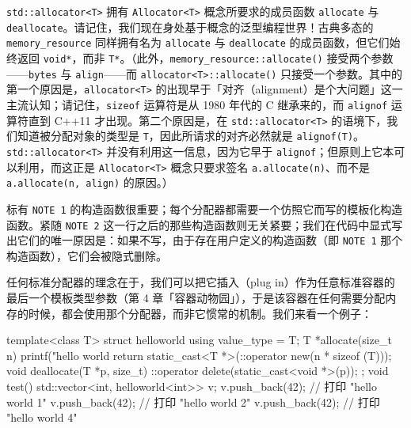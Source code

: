 \texttt{std::\allowbreak{}allocator<\allowbreak{}T>\allowbreak{}} 拥有 \texttt{Allocator<\allowbreak{}T>\allowbreak{}} 概念所要求的成员函数 \texttt{allocate} 与 \texttt{deallocate}。请记住，我们现在身处基于概念的泛型编程世界！古典多态的 \texttt{memory\_\allowbreak{}resource} 同样拥有名为 \texttt{allocate} 与 \texttt{deallocate} 的成员函数，但它们始终返回 \texttt{void*}，而非 \texttt{T*}。（此外，\texttt{memory\_\allowbreak{}resource::\allowbreak{}allocate(\allowbreak{})\allowbreak{}} 接受两个参数——\texttt{bytes} 与 \texttt{align}——而 \texttt{allocator<\allowbreak{}T>\allowbreak{}::\allowbreak{}allocate(\allowbreak{})\allowbreak{}} 只接受一个参数。其中的第一个原因是，\texttt{allocator<\allowbreak{}T>\allowbreak{}} 的出现早于「对齐（alignment）是个大问题」这一主流认知；请记住，\texttt{sizeof} 运算符是从 1980 年代的 C 继承来的，而 \texttt{alignof} 运算符直到 C++11 才出现。第二个原因是，在 \texttt{std::\allowbreak{}allocator<\allowbreak{}T>\allowbreak{}} 的语境下，我们知道被分配对象的类型是 \texttt{T}，因此所请求的对齐必然就是 \texttt{alignof(\allowbreak{}T)\allowbreak{}}。\texttt{std::\allowbreak{}allocator<\allowbreak{}T>\allowbreak{}} 并没有利用这一信息，因为它早于 \texttt{alignof}；但原则上它本可以利用，而这正是 \texttt{Allocator<\allowbreak{}T>\allowbreak{}} 概念只要求签名 \texttt{a.\allowbreak{}allocate(\allowbreak{}n)\allowbreak{}}、而不是 \texttt{a.\allowbreak{}allocate(\allowbreak{}n,\allowbreak{} align)\allowbreak{}} 的原因。）

标有 \texttt{NOTE 1} 的构造函数很重要；每个分配器都需要一个仿照它而写的模板化构造函数。紧随 \texttt{NOTE 2} 这一行之后的那些构造函数则无关紧要；我们在代码中显式写出它们的唯一原因是：如果不写，由于存在用户定义的构造函数（即 \texttt{NOTE 1} 那个构造函数），它们会被隐式删除。

任何标准分配器的理念在于，我们可以把它插入（plug in）作为任意标准容器的最后一个模板类型参数（第 4 章「容器动物园」），于是该容器在任何需要分配内存的时候，都会使用那个分配器，而非它惯常的机制。我们来看一个例子：

\begin{codebox}[cpp]
     template<class T>
     struct helloworld {
       using value_type = T;
       T *allocate(size_t n) {
         printf("hello world %
         return static_cast<T *>(::operator new(n * sizeof (T)));
       }
       void deallocate(T *p, size_t) {
         ::operator delete(static_cast<void *>(p));
       }
     };
     void test() {
       std::vector<int, helloworld<int>> v;
       v.push_back(42); // 打印 "hello world 1"
       v.push_back(42); // 打印 "hello world 2"
       v.push_back(42); // 打印 "hello world 4"
     }
\end{codebox}

